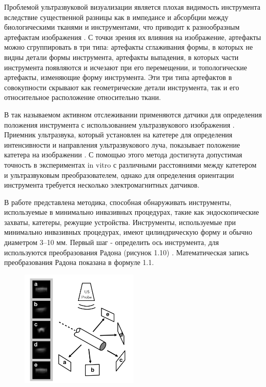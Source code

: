 Проблемой ультразвуковой визуализации является плохая видимость инструмента вследствие существенной разницы как в импедансе и абсорбции между биологическими тканями и инструментами, что приводит к разнообразным артефактам изображения \cite{litlink36}. С точки зрения их влияния на изображение, артефакты можно сгруппировать в три типа: артефакты сглаживания формы, в которых не видны детали формы инструмента, артефакты выпадения, в которых части инструмента появляются и исчезают при его перемещении, и топологические артефакты, изменяющие форму инструмента. Эти три типа артефактов в совокупности скрывают как геометрические детали инструмента, так и его относительное расположение относительно ткани.

В так называемом активном отслеживании применяются датчики для
определения положения инструмента с использованием ультразвукового изображения \cite{litlink30}. Приемник ультразвука, который установлен на катетере для определения интенсивности и направления ультразвукового луча, показывает положение катетера на изображении \cite{litlink37}. С помощью этого метода достигнута допустимая точность в экспериментах in vitro с различными расстояниями между катетером и ультразвуковым преобразователем, однако для определения ориентации инструмента требуется несколько электромагнитных датчиков.

В работе \cite{litlink38} представлена методика, способная обнаруживать инструменты, используемые в минимально инвазивных процедурах, такие как эндоскопические захваты, катетеры, режущие устройства. Инструменты, используемые при минимально инвазивных процедурах, имеют цилиндрическую форму и обычно диаметром 3–10 мм. Первый шаг - определить ось инструмента, для используются преобразования Радона (рисунок 1.10) \cite{litlink38}. Математическая запись преобразования Радона показана в формуле 1.1.

\begin{figure}[!h]
\begin{center}
\includegraphics[width=0.5\textwidth]{Рисунки/трэкинг.png}
\caption{\centering {}}
\label{част}
\end{center}
\end{figure}

